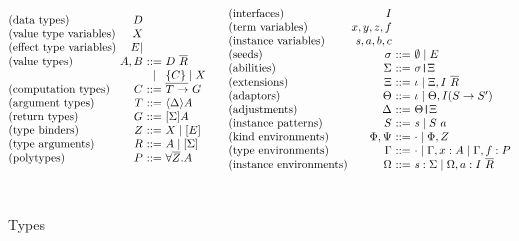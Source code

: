 \documentclass[msc,deptreport,cs]{infthesis} %
\makeatletter
\newcommand{\many}{\overline}
\newcommand\ba{\begin{array}}
\newcommand\ea{\end{array}}
\newenvironment{syn}{\ba{@{}l@{~}r@{~}c@{~}l@{}}}{\ea}
\newcommand{\adj}{\Delta}
\newcommand{\adapt}{\Theta}
\newcommand{\ext}{\Xi}
\newcommand{\sigs}{\Sigma}
\newcommand{\sig}{I}
\newcommand{\seed}{\sigma}
\newcommand{\var}{\mathit}        %
\newcommand{\thunk}[1]{\{{#1}\}}
\newcommand{\snoc}{\ }
\newcommand\slab[1]{(\textrm{#1})}
\newcommand{\ev}{E}
\newcommand{\effin}[1]{\langle {#1} \rangle}
\newcommand{\effout}[1]{[{#1}]}
\newcommand{\nowt}{\emptyset}
\newcommand{\id}{\iota}
\newcommand{\pid}{\var{s}} %
\newcommand{\kenv}{\Phi}  %
\newcommand{\kenva}{\Psi} %
\newcommand{\ienv}{\Omega} %
\newcommand{\gor}{\mid}
\newcommand{\pipe}{\texttt{|}}
\makeatother
\begin{document}
\begin{figure}[h]  %
\[
\ba{@{}c@{}}
\ba{@{}c@{\quad\quad}c@{}}
\begin{syn}
  \slab{data types}            & D \\
  \slab{value type variables}  & X \\
  \slab{effect type variables} & E| \\
  \slab{value types}           & A, B   &::= & D~\overline{R} \\
                               &        &\gor& \thunk{C} \gor X \\
  \slab{computation types}     & C      &::= & \many{T \to}~G \\
  \slab{argument types}        & T      &::= & \effin{\adj}A \\
  \slab{return types}          & G      &::= & \effout{\sigs}A \\

  \slab{type binders}          & Z      &::= & X \gor [E]\\
  \slab{type arguments}        & R      &::= & A \gor [\Sigma]\\
  \slab{polytypes}             & P      &::= & \forall \overline{Z}.A \\
\end{syn}
&
\begin{syn}
  \slab{interfaces}           & I \\
  \slab{term variables}       & x, y, z, f \\
  \slab{instance variables}   & \pid, a, b, c \\
  \slab{seeds}                & \seed  &::= & \nowt \gor \ev \\
  \slab{abilities}            & \sigs  &::= & \seed\pipe\ext \\
  \slab{extensions}           & \ext   &::= & \id \gor \ext, \sig~\many{R} \\
  \slab{adaptors}             & \adapt &::= & \id \gor \adapt, \sig(S \to S') \\
  \slab{adjustments}          & \adj   &::= & \adapt\pipe\ext \\
  \slab{instance patterns}    & S      &::= & \pid \gor S \snoc a \\
  \slab{kind environments}    & \kenv,
                                \kenva &::= & \cdot \gor \kenv, Z \\
  \slab{type environments}    & \Gamma &::= & \cdot \gor \Gamma, x:A %
                                              \gor \Gamma, f:P\\
 \slab{instance environments} & \ienv  &::= & \pid:\sigs \gor \ienv, a:\sig~\many{R}\\
\end{syn} \\
\ea \\
\ea
\]
\\[0.25cm]

\caption{Types}
\label{fig:types}
\end{figure}
\end{document}
